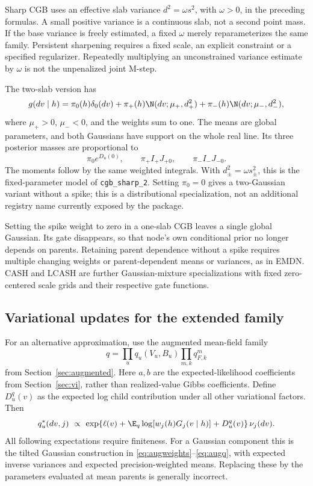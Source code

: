 Sharp CGB uses an effective slab variance \(d^2=\omega s^2\), with
\(\omega>0\), in the preceding formulas. A small positive variance is a
continuous slab, not a second point mass. If the base variance is freely
estimated, a fixed \(\omega\) merely reparameterizes the same family.
Persistent sharpening requires a fixed scale, an explicit constraint or
a specified regularizer. Repeatedly multiplying an unconstrained variance
estimate by \(\omega\) is not the unpenalized joint M-step.

The two-slab version has
\begin{equation}\label{eq:familycgb2}
g(dv\mid h)=\pi_0(h)\delta_0(dv)
+\pi_+(h)\N(dv;\mu_+,d_+^2)
+\pi_-(h)\N(dv;\mu_-,d_-^2),
\end{equation}
where \(\mu_+>0\), \(\mu_-<0\), and the weights sum to one.
The means are global parameters, and both Gaussians have support on
the whole real line. Its three posterior masses are proportional to
\[
\pi_0 e^{D_u(0)},\qquad
\pi_+I_+J_{+0},\qquad
\pi_-I_-J_{-0}.
\]
The moments follow by the same weighted integrals. With
\(d_\pm^2=\omega s_\pm^2\), this is the fixed-parameter model of
\texttt{cgb\_sharp\_2}. Setting \(\pi_0=0\) gives a two-Gaussian variant
without a spike; this is a distributional specialization, not an additional
registry name currently exposed by the package.

Setting the spike weight to zero in a one-slab CGB leaves a single global
Gaussian. Its gate disappears, so that node's own conditional prior no
longer depends on parents. Retaining parent dependence without a spike
requires multiple changing weights or parent-dependent means or variances,
as in EMDN. CASH and LCASH are further Gaussian-mixture specializations
with fixed zero-centered scale grids and their respective gate functions.

\subsection{Variational updates for the extended family}
\label{sec:familyvi}
For an alternative approximation, use the augmented mean-field family
\[
q=\prod_uq_u(V_u,B_u)\prod_{m,k}q^m_{F,k}
\]
from Section~\ref{sec:augmented}. Here \(a,b\) are the expected-likelihood
coefficients from Section~\ref{sec:vi}, rather than realized-value Gibbs
coefficients. Define \(D_u^q(v)\) as the expected log child contribution
under all other variational factors. Then
\begin{equation}\label{eq:familycavi}
q_u^*(dv,j)\ \propto\
\exp\{\ell(v)+\E_q\log[w_j(h)G_j(v\mid h)]+D_u^q(v)\}\,\nu_j(dv).
\end{equation}
All following expectations require finiteness. For a Gaussian component
this is the tilted Gaussian construction in
\eqref{eq:augweights}--\eqref{eq:augq}, with expected inverse variances
and expected precision-weighted means. Replacing these by the parameters
evaluated at mean parents is generally incorrect.

